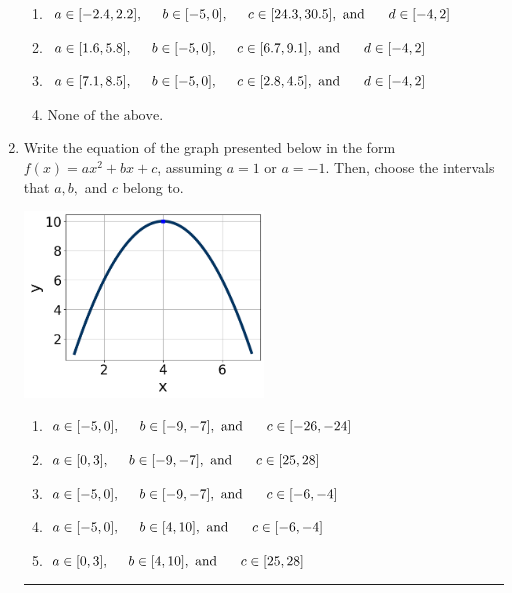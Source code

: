 \documentclass[14pt]{extbook}
\newcommand{\litem}[1]{\item#1\hspace*{-1cm}\rule{\textwidth}{0.4pt}}
\begin{document}
\begin{enumerate}
{\begin{enumerate}[label=\Alph*.]
\item \( a \in [-2.4, 2.2], \hspace*{5mm} b \in [-5, 0], \hspace*{5mm} c \in [24.3, 30.5], \text{ and } \hspace*{5mm} d \in [-4, 2] \)
\item \( a \in [1.6, 5.8], \hspace*{5mm} b \in [-5, 0], \hspace*{5mm} c \in [6.7, 9.1], \text{ and } \hspace*{5mm} d \in [-4, 2] \)
\item \( a \in [7.1, 8.5], \hspace*{5mm} b \in [-5, 0], \hspace*{5mm} c \in [2.8, 4.5], \text{ and } \hspace*{5mm} d \in [-4, 2] \)
\item \( \text{None of the above.} \)

\end{enumerate} }
\litem{
Write the equation of the graph presented below in the form $f(x)=ax^2+bx+c$, assuming  $a=1$ or $a=-1$. Then, choose the intervals that $a, b,$ and $c$ belong to.
\begin{center}
    \includegraphics[width=0.5\textwidth]{../Figures/quadraticGraphToEquationCopyB.png}
\end{center}
\begin{enumerate}[label=\Alph*.]
\item \( a \in [-5, 0], \hspace*{5mm} b \in [-9, -7], \text{ and } \hspace*{5mm} c \in [-26, -24] \)
\item \( a \in [0, 3], \hspace*{5mm} b \in [-9, -7], \text{ and } \hspace*{5mm} c \in [25, 28] \)
\item \( a \in [-5, 0], \hspace*{5mm} b \in [-9, -7], \text{ and } \hspace*{5mm} c \in [-6, -4] \)
\item \( a \in [-5, 0], \hspace*{5mm} b \in [4, 10], \text{ and } \hspace*{5mm} c \in [-6, -4] \)
\item \( a \in [0, 3], \hspace*{5mm} b \in [4, 10], \text{ and } \hspace*{5mm} c \in [25, 28] \)


\end{enumerate}}
\end{enumerate}
\end{document}
